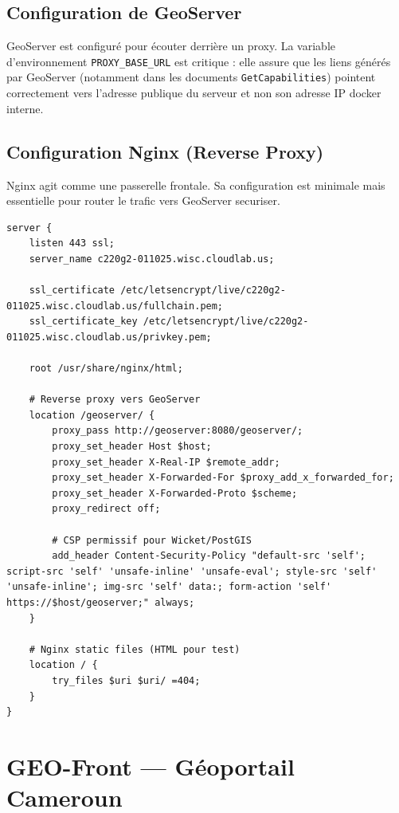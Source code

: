 \documentclass[11pt,a4paper]{article}
\begin{document}
\subsection{Configuration de GeoServer}
GeoServer est configuré pour écouter derrière un proxy. La variable d'environnement \texttt{PROXY\_BASE\_URL} est critique : elle assure que les liens générés par GeoServer (notamment dans les documents \texttt{GetCapabilities}) pointent correctement vers l'adresse publique du serveur et non son adresse IP docker interne.

\subsection{Configuration Nginx (Reverse Proxy)}
Nginx agit comme une passerelle frontale. Sa configuration est minimale mais essentielle pour router le trafic vers GeoServer securiser.

\begin{tcolorbox}[colback=white, colframe=SlateGray, title=Configuration Nginx (nginx.conf)]
\begin{verbatim}
server {
    listen 443 ssl;
    server_name c220g2-011025.wisc.cloudlab.us;

    ssl_certificate /etc/letsencrypt/live/c220g2-011025.wisc.cloudlab.us/fullchain.pem;
    ssl_certificate_key /etc/letsencrypt/live/c220g2-011025.wisc.cloudlab.us/privkey.pem;

    root /usr/share/nginx/html;

    # Reverse proxy vers GeoServer
    location /geoserver/ {
        proxy_pass http://geoserver:8080/geoserver/;
        proxy_set_header Host $host;
        proxy_set_header X-Real-IP $remote_addr;
        proxy_set_header X-Forwarded-For $proxy_add_x_forwarded_for;
        proxy_set_header X-Forwarded-Proto $scheme;
        proxy_redirect off;

        # CSP permissif pour Wicket/PostGIS
        add_header Content-Security-Policy "default-src 'self'; script-src 'self' 'unsafe-inline' 'unsafe-eval'; style-src 'self' 'unsafe-inline'; img-src 'self' data:; form-action 'self' https://$host/geoserver;" always;
    }

    # Nginx static files (HTML pour test)
    location / {
        try_files $uri $uri/ =404;
    }
}
\end{verbatim}
\end{tcolorbox}

\section{GEO-Front — Géoportail Cameroun}
\end{document}
